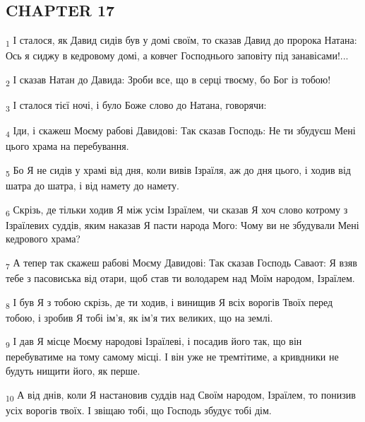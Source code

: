 \subsection{CHAPTER 17}
\begin{tcolorbox}
\textsubscript{1} І сталося, як Давид сидів був у домі своїм, то сказав Давид до пророка Натана: Ось я сиджу в кедровому домі, а ковчег Господнього заповіту під занавісами!...
\end{tcolorbox}
\begin{tcolorbox}
\textsubscript{2} І сказав Натан до Давида: Зроби все, що в серці твоєму, бо Бог із тобою!
\end{tcolorbox}
\begin{tcolorbox}
\textsubscript{3} І сталося тієї ночі, і було Боже слово до Натана, говорячи:
\end{tcolorbox}
\begin{tcolorbox}
\textsubscript{4} Іди, і скажеш Моєму рабові Давидові: Так сказав Господь: Не ти збудуєш Мені цього храма на перебування.
\end{tcolorbox}
\begin{tcolorbox}
\textsubscript{5} Бо Я не сидів у храмі від дня, коли вивів Ізраїля, аж до дня цього, і ходив від шатра до шатра, і від намету до намету.
\end{tcolorbox}
\begin{tcolorbox}
\textsubscript{6} Скрізь, де тільки ходив Я між усім Ізраїлем, чи сказав Я хоч слово котрому з Ізраїлевих суддів, яким наказав Я пасти народа Мого: Чому ви не збудували Мені кедрового храма?
\end{tcolorbox}
\begin{tcolorbox}
\textsubscript{7} А тепер так скажеш рабові Моєму Давидові: Так сказав Господь Саваот: Я взяв тебе з пасовиська від отари, щоб став ти володарем над Моїм народом, Ізраїлем.
\end{tcolorbox}
\begin{tcolorbox}
\textsubscript{8} І був Я з тобою скрізь, де ти ходив, і винищив Я всіх ворогів Твоїх перед тобою, і зробив Я тобі ім'я, як ім'я тих великих, що на землі.
\end{tcolorbox}
\begin{tcolorbox}
\textsubscript{9} І дав Я місце Моєму народові Ізраїлеві, і посадив його так, що він перебуватиме на тому самому місці. І він уже не тремтітиме, а кривдники не будуть нищити його, як перше.
\end{tcolorbox}
\begin{tcolorbox}
\textsubscript{10} А від днів, коли Я настановив суддів над Своїм народом, Ізраїлем, то понизив усіх ворогів твоїх. І звіщаю тобі, що Господь збудує тобі дім.
\end{tcolorbox}
